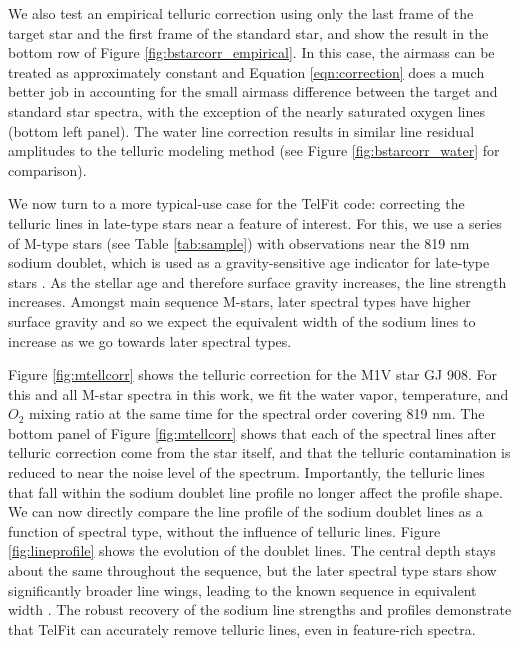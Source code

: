 We also test an empirical telluric correction using only the last frame of the target star and the first frame of the standard star, and show the result in the bottom row of Figure \ref{fig:bstarcorr_empirical}. In this case, the airmass can be treated as approximately constant and Equation \ref{eqn:correction} does a much better job in accounting for the small airmass difference between the target and standard star spectra, with the exception of the nearly saturated oxygen lines (bottom left panel). The water line correction results in similar line residual amplitudes to the telluric modeling method (see Figure \ref{fig:bstarcorr_water} for comparison).


We now turn to a more typical-use case for the TelFit code: correcting the telluric lines in late-type stars near a feature of interest. For this, we use a series of M-type stars (see Table \ref{tab:sample}) with observations near the 819 nm sodium doublet, which is used as a gravity-sensitive age indicator for late-type stars \citep{Slesnick2006}. As the stellar age and therefore surface gravity increases, the line strength increases. Amongst main sequence M-stars, later spectral types have higher surface gravity and so we expect the equivalent width of the sodium lines to increase as we go towards later spectral types. 


Figure \ref{fig:mtellcorr} shows the telluric correction for the M1V star GJ 908. For this and all M-star spectra in this work, we fit the water vapor, temperature, and $O_2$ mixing ratio at the same time for the spectral order covering 819 nm. The bottom panel of Figure \ref{fig:mtellcorr} shows that each of the spectral lines after telluric correction come from the star itself, and that the telluric contamination is reduced to near the noise level of the spectrum. Importantly, the telluric lines that fall within the sodium doublet line profile no longer affect the profile shape. We can now directly compare the line profile of the sodium doublet lines as a function of spectral type, without the influence of telluric lines. Figure \ref{fig:lineprofile} shows the evolution of the doublet lines. The central depth stays about the same throughout the sequence, but the later spectral type stars show significantly broader line wings, leading to the known sequence in equivalent width \citep{Slesnick2006}. The robust recovery of the sodium line strengths and profiles demonstrate that TelFit can accurately remove telluric lines, even in feature-rich spectra. 


